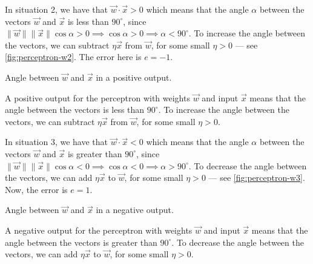 In situation 2, we have that $\vec{w} \cdot \vec{x} > 0$ which means that the angle
$\alpha$ between the vectors $\vec{w}$ and $\vec{x}$ is less than $90^\circ$, since
$\|\vec{w}\|\|\vec{x}\|\cos\alpha > 0 \implies \cos\alpha > 0 \implies \alpha <
90^\circ$.  To increase the angle between the vectors, we can subtract $\eta\vec{x}$ from
$\vec{w}$, for some small $\eta > 0$ --- see \cref{fig:perceptron-w2}.  The error
here is $e = -1$.

\begin{figurebox}[label=fig:perceptron-w2]{Angle between $\vec{w}$ and $\vec{x}$ in a positive output.}
  \centering
  \tcblower
  A positive output for the perceptron with weights $\vec{w}$ and input $\vec{x}$ means
  that the angle between the vectors is less than $90^\circ$.  To increase the angle
  between the vectors, we can subtract $\eta\vec{x}$ from $\vec{w}$, for some small $\eta
  > 0$.
\end{figurebox}

In situation 3, we have that $\vec{w} \cdot \vec{x} < 0$ which means that the
angle $\alpha$ between the vectors $\vec{w}$ and $\vec{x}$ is greater than $90^\circ$,
since $\|\vec{w}\|\|\vec{x}\|\cos\alpha < 0 \implies \cos\alpha < 0 \implies \alpha > 90^\circ$.
To decrease the angle between the vectors, we can add $\eta\vec{x}$ to $\vec{w}$, for
some small $\eta > 0$ --- see \cref{fig:perceptron-w3}.  Now, the error is $e = 1$.

\begin{figurebox}[label=fig:perceptron-w3]{Angle between $\vec{w}$ and $\vec{x}$ in a negative output.}
  \centering
  \tcblower
  A negative output for the perceptron with weights $\vec{w}$ and input $\vec{x}$ means
  that the angle between the vectors is greater than $90^\circ$.  To decrease the angle
  between the vectors, we can add $\eta\vec{x}$ to $\vec{w}$, for some small $\eta
  > 0$.
\end{figurebox}

